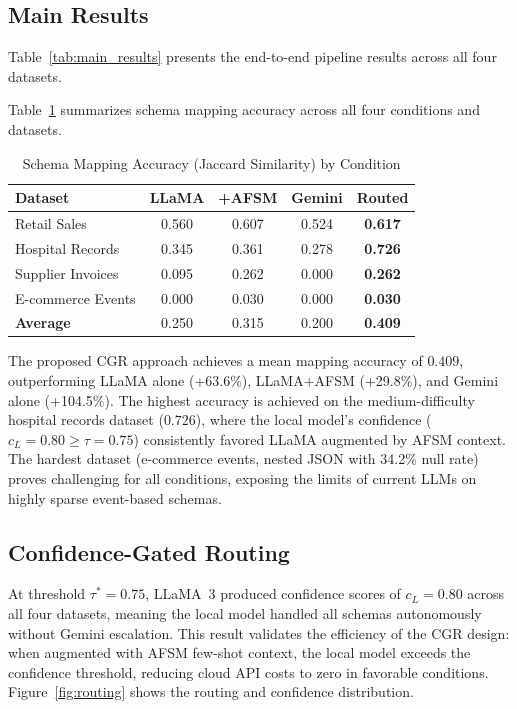 \documentclass[conference]{IEEEtran}
\begin{document}
\subsection{Main Results}

Table~\ref{tab:main_results} presents the end-to-end pipeline results
across all four datasets.


Table~\ref{tab:mapping_results} summarizes schema mapping accuracy across
all four conditions and datasets.

\begin{table}[htbp]
\centering
\caption{Schema Mapping Accuracy (Jaccard Similarity) by Condition}
\label{tab:mapping_results}
\begin{tabular}{lcccc}
\toprule
Dataset & LLaMA & +AFSM & Gemini & Routed \\
\midrule
Retail Sales & 0.560 & 0.607 & 0.524 & \textbf{0.617} \\
Hospital Records & 0.345 & 0.361 & 0.278 & \textbf{0.726} \\
Supplier Invoices & 0.095 & 0.262 & 0.000 & \textbf{0.262} \\
E-commerce Events & 0.000 & 0.030 & 0.000 & \textbf{0.030} \\
\midrule
\textbf{Average} & 0.250 & 0.315 & 0.200 & \textbf{0.409} \\
\bottomrule
\end{tabular}
\end{table}

The proposed CGR approach achieves a mean mapping accuracy of $\mathbf{0.409}$,
outperforming LLaMA alone (+63.6\%), LLaMA+AFSM (+29.8\%), and
Gemini alone (+104.5\%). The highest accuracy is achieved on the medium-difficulty
hospital records dataset ($0.726$), where the local model's confidence
($c_L=0.80 \geq \tau=0.75$) consistently favored LLaMA augmented by AFSM context.
The hardest dataset (e-commerce events, nested JSON with 34.2\% null rate)
proves challenging for all conditions, exposing the limits of current LLMs
on highly sparse event-based schemas.

\subsection{Confidence-Gated Routing}

At threshold $\tau^*=0.75$, LLaMA~3 produced confidence scores of $c_L=0.80$
across all four datasets, meaning the local model handled all schemas autonomously
without Gemini escalation. This result validates the efficiency of the CGR design:
when augmented with AFSM few-shot context, the local model exceeds the confidence
threshold, reducing cloud API costs to zero in favorable conditions.
Figure~\ref{fig:routing} shows the routing and confidence distribution.
\end{document}
